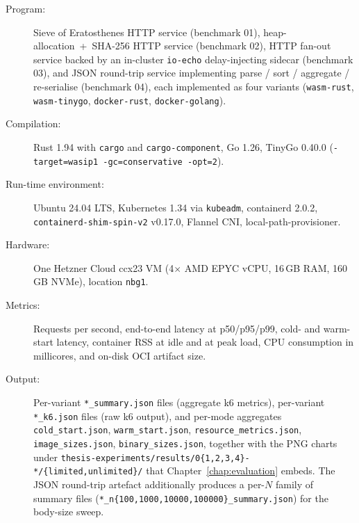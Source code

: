 \begin{description}
    \item[Program:] \begin{sloppypar}Sieve of Eratosthenes \acs{HTTP} service (benchmark 01), heap-allocation~+~SHA-256 \acs{HTTP} service (benchmark 02), HTTP fan-out service backed by an in-cluster \texttt{io-echo} delay-injecting sidecar (benchmark 03), and \acs{JSON} round-trip service implementing parse / sort / aggregate / re-serialise (benchmark 04), each implemented as four variants (\texttt{wasm-rust}, \texttt{wasm-tinygo}, \texttt{docker-rust}, \texttt{docker-golang}).\end{sloppypar}
    \item[Compilation:] \begin{sloppypar}Rust 1.94 with \texttt{cargo} and \texttt{cargo-component}, Go 1.26, TinyGo 0.40.0 (\texttt{-target=wasip1 -gc=conservative -opt=2}).\end{sloppypar}
    \item[Run-time environment:] \begin{sloppypar}Ubuntu 24.04 LTS, Kubernetes 1.34 via \texttt{kubeadm}, containerd 2.0.2, \texttt{containerd-shim-spin-v2} v0.17.0, Flannel CNI, local-path-provisioner.\end{sloppypar}
    \item[Hardware:] \begin{sloppypar}One Hetzner Cloud ccx23 \acs{VM} (4$\times$ AMD EPYC vCPU, 16\,GB \acs{RAM}, 160\,GB NVMe), location \texttt{nbg1}.\end{sloppypar}
    \item[Metrics:] Requests per second, end-to-end latency at p50/p95/p99, cold- and warm-start latency, container \acs{RSS} at idle and at peak load, \acs{CPU} consumption in millicores, and on-disk \acs{OCI} artifact size.
    \item[Output:] \begin{sloppypar}Per-variant \texttt{*\_summary.json} files (aggregate k6 metrics), per-variant \texttt{*\_k6.json} files (raw k6 output), and per-mode aggregates \texttt{cold\_start.json}, \texttt{warm\_start.json}, \texttt{resource\_metrics.json}, \texttt{image\_sizes.json}, \texttt{binary\_sizes.json}, together with the PNG charts under \texttt{thesis-experiments/results/0\{1,2,3,4\}-*/\{limited,unlimited\}/} that Chapter~\ref{chap:evaluation} embeds. The \acs{JSON} round-trip artefact additionally produces a per-$N$ family of summary files (\texttt{*\_n\{100,1000,10000,100000\}\_summary.json}) for the body-size sweep.\end{sloppypar}

\end{description}
